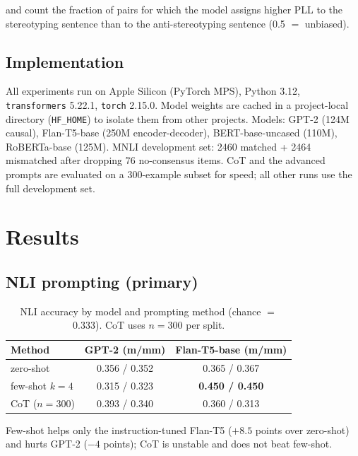 \documentclass[11pt]{article}
\begin{document}
and count the fraction of pairs for which the model assigns higher PLL to the stereotyping sentence than to the anti-stereotyping sentence (0.5 $=$ unbiased).

\subsection{Implementation}
All experiments run on Apple Silicon (PyTorch MPS), Python 3.12, \texttt{transformers} 5.22.1, \texttt{torch} 2.15.0. Model weights are cached in a project-local directory (\texttt{HF\_HOME}) to isolate them from other projects. Models: GPT-2 (124M causal), Flan-T5-base (250M encoder-decoder), BERT-base-uncased (110M), RoBERTa-base (125M). MNLI development set: 2460 matched + 2464 mismatched after dropping 76 no-consensus items. CoT and the advanced prompts are evaluated on a 300-example subset for speed; all other runs use the full development set.

\section{Results}

\subsection{NLI prompting (primary)}\label{sec:res-nli}
\begin{table}[h]
\centering
\caption{NLI accuracy by model and prompting method (chance $=$ 0.333). CoT uses $n=300$ per split.}
\begin{tabular}{lcc}
\toprule
\textbf{Method} & \textbf{GPT-2 (m/mm)} & \textbf{Flan-T5-base (m/mm)} \\
\midrule
zero-shot            & 0.356 / 0.352 & 0.365 / 0.367 \\
few-shot $k=4$       & 0.315 / 0.323 & \textbf{0.450 / 0.450} \\
CoT ($n=300$)        & 0.393 / 0.340 & 0.360 / 0.313 \\
\bottomrule
\end{tabular}
\end{table}

Few-shot helps only the instruction-tuned Flan-T5 ($+8.5$ points over zero-shot) and hurts GPT-2 ($-4$ points); CoT is unstable and does not beat few-shot.
\end{document}
